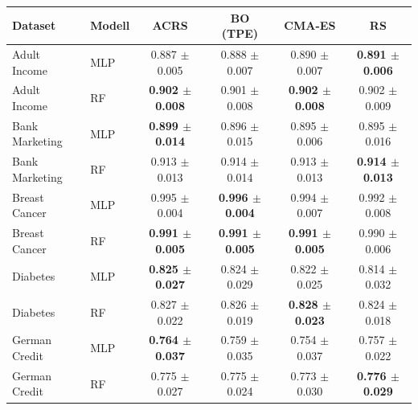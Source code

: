 \begin{tabular}{llcccc}
\toprule
Dataset & Modell & ACRS & BO (TPE) & CMA-ES & RS \\
\midrule
Adult Income & MLP & 0.887 $\pm$ 0.005 & 0.888 $\pm$ 0.007 & 0.890 $\pm$ 0.007 & \textbf{0.891 $\pm$ 0.006} \\
Adult Income & RF & \textbf{0.902 $\pm$ 0.008} & 0.901 $\pm$ 0.008 & \textbf{0.902 $\pm$ 0.008} & 0.902 $\pm$ 0.009 \\
\midrule
Bank Marketing & MLP & \textbf{0.899 $\pm$ 0.014} & 0.896 $\pm$ 0.015 & 0.895 $\pm$ 0.006 & 0.895 $\pm$ 0.016 \\
Bank Marketing & RF & 0.913 $\pm$ 0.013 & 0.914 $\pm$ 0.014 & 0.913 $\pm$ 0.013 & \textbf{0.914 $\pm$ 0.013} \\
\midrule
Breast Cancer & MLP & 0.995 $\pm$ 0.004 & \textbf{0.996 $\pm$ 0.004} & 0.994 $\pm$ 0.007 & 0.992 $\pm$ 0.008 \\
Breast Cancer & RF & \textbf{0.991 $\pm$ 0.005} & \textbf{0.991 $\pm$ 0.005} & \textbf{0.991 $\pm$ 0.005} & 0.990 $\pm$ 0.006 \\
\midrule
Diabetes & MLP & \textbf{0.825 $\pm$ 0.027} & 0.824 $\pm$ 0.029 & 0.822 $\pm$ 0.025 & 0.814 $\pm$ 0.032 \\
Diabetes & RF & 0.827 $\pm$ 0.022 & 0.826 $\pm$ 0.019 & \textbf{0.828 $\pm$ 0.023} & 0.824 $\pm$ 0.018 \\
\midrule
German Credit & MLP & \textbf{0.764 $\pm$ 0.037} & 0.759 $\pm$ 0.035 & 0.754 $\pm$ 0.037 & 0.757 $\pm$ 0.022 \\
German Credit & RF & 0.775 $\pm$ 0.027 & 0.775 $\pm$ 0.024 & 0.773 $\pm$ 0.030 & \textbf{0.776 $\pm$ 0.029} \\
\bottomrule
\end{tabular}
